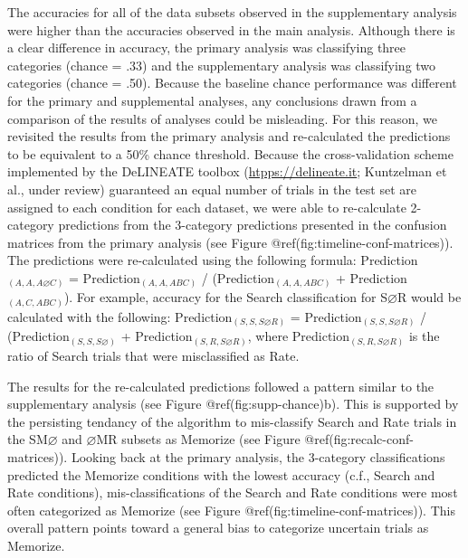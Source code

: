 \begin{appendix}
The accuracies for all of the data subsets observed in the supplementary
analysis were higher than the accuracies observed in the main analysis.
Although there is a clear difference in accuracy, the primary analysis
was classifying three categories (chance = .33) and the supplementary
analysis was classifying two categories (chance = .50). Because the
baseline chance performance was different for the primary and
supplemental analyses, any conclusions drawn from a comparison of the
results of analyses could be misleading. For this reason, we revisited
the results from the primary analysis and re-calculated the predictions
to be equivalent to a 50\% chance threshold. Because the
cross-validation scheme implemented by the DeLINEATE toolbox
(\href{https://delineate.it}{htpps://delineate.it}; Kuntzelman et al.,
under review) guaranteed an equal number of trials in the test set are
assigned to each condition for each dataset, we were able to
re-calculate 2-category predictions from the 3-category predictions
presented in the confusion matrices from the primary analysis (see
Figure @ref(fig:timeline-conf-matrices)). The predictions were
re-calculated using the following formula:
Prediction\(_{(A, A, A\varnothing C)}\) = Prediction\(_{(A, A, ABC)}\) /
(Prediction\(_{(A, A, ABC)}\) + Prediction\(_{(A, C, ABC)}\)). For
example, accuracy for the Search classification for S\(\varnothing\)R
would be calculated with the following:
Prediction\(_{(S, S, S\varnothing R)}\) =
Prediction\(_{(S, S, S\varnothing R)}\) /
(Prediction\(_{(S, S, S\varnothing)}\) +
Prediction\(_{(S, R, S\varnothing R)}\), where
Prediction\(_{(S, R, S\varnothing R)}\) is the ratio of Search trials
that were misclassified as Rate.

The results for the re-calculated predictions followed a pattern similar
to the supplementary analysis (see Figure @ref(fig:supp-chance)b). This
is supported by the persisting tendancy of the algorithm to mis-classify
Search and Rate trials in the SM\(\varnothing\) and \(\varnothing\)MR
subsets as Memorize (see Figure @ref(fig:recalc-conf-matrices)). Looking
back at the primary analysis, the 3-category classifications predicted
the Memorize conditions with the lowest accuracy (c.f., Search and Rate
conditions), mis-classifications of the Search and Rate conditions were
most often categorized as Memorize (see Figure
@ref(fig:timeline-conf-matrices)). This overall pattern points toward a
general bias to categorize uncertain trials as Memorize.


\end{appendix}

